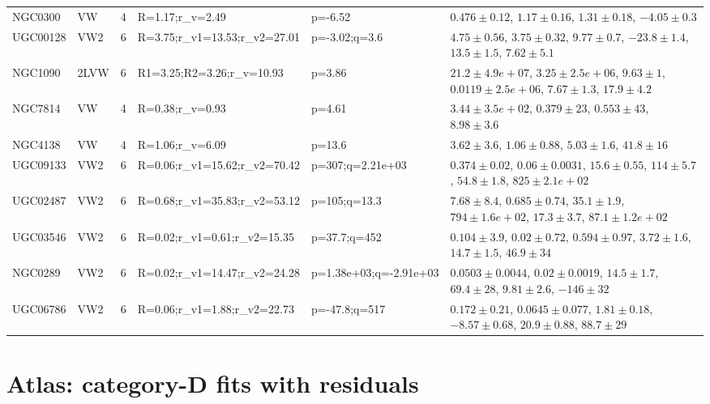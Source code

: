 \documentclass[10pt]{article}
\begin{document}
\begin{landscape}
{\begin{longtable}{llrlll}
NGC0300 & VW & 4 & R=1.17;r\_v=2.49 & p=-6.52 & $0.476\pm0.12$, $1.17\pm0.16$, $1.31\pm0.18$, $-4.05\pm0.3$\\
UGC00128 & VW2 & 6 & R=3.75;r\_v1=13.53;r\_v2=27.01 & p=-3.02;q=3.6 & $4.75\pm0.56$, $3.75\pm0.32$, $9.77\pm0.7$, $-23.8\pm1.4$, $13.5\pm1.5$, $7.62\pm5.1$\\
NGC1090 & 2LVW & 6 & R1=3.25;R2=3.26;r\_v=10.93 & p=3.86 & $21.2\pm4.9e+07$, $3.25\pm2.5e+06$, $9.63\pm1$, $0.0119\pm2.5e+06$, $7.67\pm1.3$, $17.9\pm4.2$\\
NGC7814 & VW & 4 & R=0.38;r\_v=0.93 & p=4.61 & $3.44\pm3.5e+02$, $0.379\pm23$, $0.553\pm43$, $8.98\pm3.6$\\
NGC4138 & VW & 4 & R=1.06;r\_v=6.09 & p=13.6 & $3.62\pm3.6$, $1.06\pm0.88$, $5.03\pm1.6$, $41.8\pm16$\\
UGC09133 & VW2 & 6 & R=0.06;r\_v1=15.62;r\_v2=70.42 & p=307;q=2.21e+03 & $0.374\pm0.02$, $0.06\pm0.0031$, $15.6\pm0.55$, $114\pm5.7$, $54.8\pm1.8$, $825\pm2.1e+02$\\
UGC02487 & VW2 & 6 & R=0.68;r\_v1=35.83;r\_v2=53.12 & p=105;q=13.3 & $7.68\pm8.4$, $0.685\pm0.74$, $35.1\pm1.9$, $794\pm1.6e+02$, $17.3\pm3.7$, $87.1\pm1.2e+02$\\
UGC03546 & VW2 & 6 & R=0.02;r\_v1=0.61;r\_v2=15.35 & p=37.7;q=452 & $0.104\pm3.9$, $0.02\pm0.72$, $0.594\pm0.97$, $3.72\pm1.6$, $14.7\pm1.5$, $46.9\pm34$\\
NGC0289 & VW2 & 6 & R=0.02;r\_v1=14.47;r\_v2=24.28 & p=1.38e+03;q=-2.91e+03 & $0.0503\pm0.0044$, $0.02\pm0.0019$, $14.5\pm1.7$, $69.4\pm28$, $9.81\pm2.6$, $-146\pm32$\\
UGC06786 & VW2 & 6 & R=0.06;r\_v1=1.88;r\_v2=22.73 & p=-47.8;q=517 & $0.172\pm0.21$, $0.0645\pm0.077$, $1.81\pm0.18$, $-8.57\pm0.68$, $20.9\pm0.88$, $88.7\pm29$\\
\end{longtable}}\end{landscape}
\section*{Atlas: category-D fits with residuals}
\end{document}
